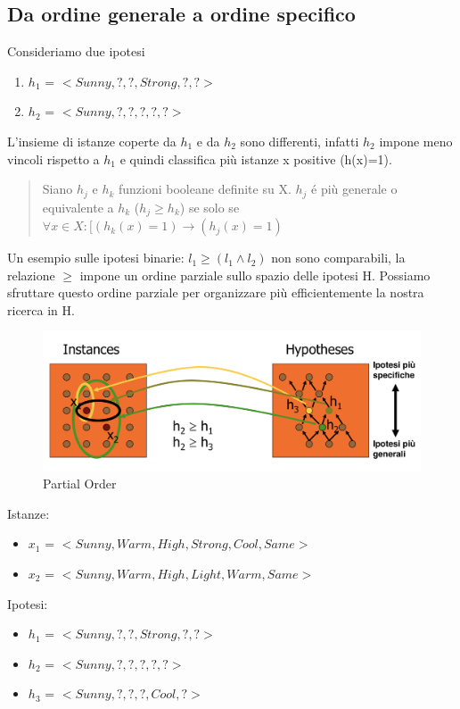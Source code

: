 \documentclass{article}
\begin{document}
\subsection{Da ordine generale a ordine specifico}
Consideriamo due ipotesi
\begin{enumerate}
    \item $h_1$ = $<Sunny,?,?,Strong,?,?>$
    \item $h_2$ = $<Sunny,?,?,?,?,?>$
\end{enumerate}
L'insieme di istanze coperte da $h_1$ e da $h_2$ sono differenti, infatti $h_2$ impone meno vincoli rispetto a $h_1$ e quindi classifica più istanze x positive (h(x)=1).
\begin{quote}
    Siano $h_j$ e $h_k$ funzioni booleane definite su X. $h_j$ é più generale o equivalente a $h_k$ ($h_j \geq h_k$) se solo se $\forall x \in X : [(h_k(x)=1) \rightarrow (h_j(x)=1)$
\end{quote}
Un esempio sulle ipotesi binarie: $l_1 \geq (l_1 \land l_2)$ non sono comparabili, la relazione $\geq$ impone un ordine parziale sullo spazio delle ipotesi H. Possiamo sfruttare questo ordine parziale per organizzare più efficientemente la nostra ricerca in H.
\begin{figure}[H]
    \centering
    \includegraphics[scale=0.4]{Images/partialorder.png}
    \caption{Partial Order}
\end{figure}
Istanze:
\begin{itemize}
    \item $x_1$ = $<Sunny,Warm,High,Strong,Cool,Same>$
    \item $x_2$ = $<Sunny,Warm,High,Light,Warm,Same>$
\end{itemize}
Ipotesi:
\begin{itemize}
    \item $h_1$ = $<Sunny,?,?,Strong,?,?>$
    \item $h_2$ = $<Sunny,?,?,?,?,?>$
    \item $h_3$ = $<Sunny,?,?,?,Cool,?>$
\end{itemize}
\end{document}
